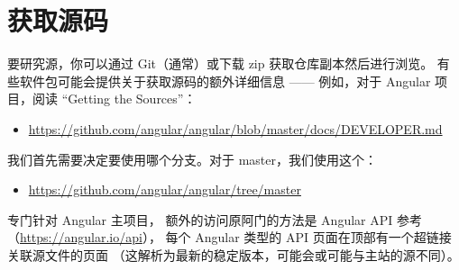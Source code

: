 \section{获取源码}


要研究源，你可以通过 Git（通常）或下载 zip 获取仓库副本然后进行浏览。
有些软件包可能会提供关于获取源码的额外详细信息 ——
例如，对于 Angular 项目，阅读 “Getting the Sources”：

\begin{itemize}
  \item \url{https://github.com/angular/angular/blob/master/docs/DEVELOPER.md}
\end{itemize}


我们首先需要决定要使用哪个分支。对于 master，我们使用这个：

\begin{itemize}
  \item \url{https://github.com/angular/angular/tree/master}
\end{itemize}


专门针对 Angular 主项目，
额外的访问原阿门的方法是 Angular API 参考（\url{https://angular.io/api}），
每个 Angular 类型的 API 页面在顶部有一个超链接关联源文件的页面
（这解析为最新的稳定版本，可能会或可能与主站的源不同）。
